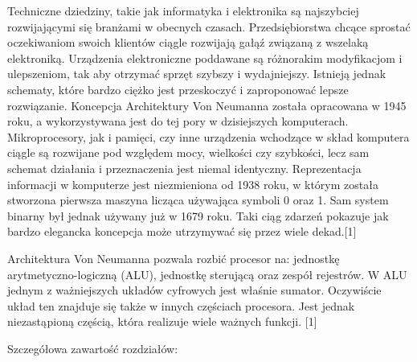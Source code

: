 \documentclass[12pt, a4paper, onside, polish]{article}				%
\begin{document}
Techniczne dziedziny, takie jak informatyka i elektronika są najszybciej rozwijającymi się branżami w obecnych czasach. Przedsiębiorstwa chcące sprostać oczekiwaniom swoich klientów ciągle rozwijają gałąź związaną z wszelaką elektroniką. Urządzenia elektroniczne poddawane są różnorakim modyfikacjom i ulepszeniom, tak aby otrzymać sprzęt szybszy i wydajniejszy. Istnieją jednak schematy, które bardzo ciężko jest przeskoczyć i zaproponować lepsze rozwiązanie. Koncepcja Architektury Von Neumanna została opracowana w 1945 roku, a wykorzystywana jest do tej pory w dzisiejszych komputerach. Mikroprocesory, jak i pamięci, czy inne urządzenia wchodzące w skład komputera ciągle są rozwijane pod względem mocy, wielkości czy szybkości, lecz sam schemat działania i przeznaczenia jest niemal identyczny. Reprezentacja informacji w komputerze jest niezmieniona od 1938 roku, w którym została stworzona pierwsza maszyna licząca używająca symboli 0 oraz 1. Sam system binarny był jednak używany już w 1679 roku. Taki ciąg zdarzeń pokazuje jak bardzo elegancka koncepcja może utrzymywać się przez wiele dekad.[1]

Architektura Von Neumanna pozwala rozbić procesor na: jednostkę arytmetyczno-logiczną (ALU), jednostkę sterującą oraz zespół rejestrów. W ALU jednym z ważniejszych układów cyfrowych jest właśnie sumator. Oczywiście układ ten znajduje się także w innych częściach procesora. Jest jednak niezastąpioną częścią, która realizuje wiele ważnych funkcji. [1]\newline

Szczegółowa zawartość rozdziałów:
\end{document}
